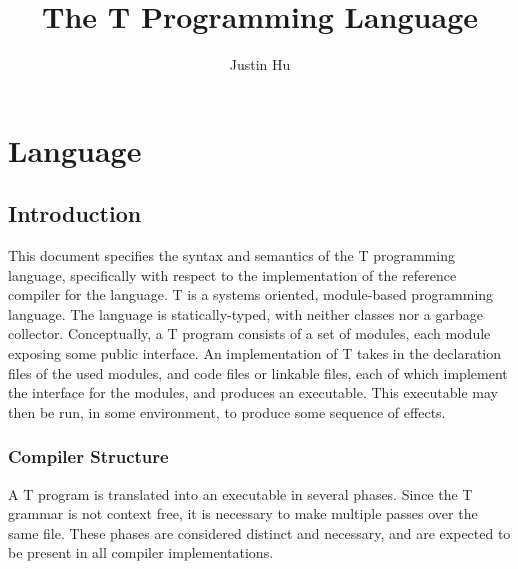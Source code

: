 \documentclass[letterpaper,12pt]{book}
\begin{document}
\title{The T Programming Language}
\author{Justin Hu}
\maketitle
\tableofcontents

\part{Language}

\chapter{Introduction}

This document specifies the syntax and semantics of the T programming language, specifically with respect to the implementation of the reference compiler for the language. T is a systems oriented, module-based programming language. The language is statically-typed, with neither classes nor a garbage collector. Conceptually, a T program consists of a set of modules, each module exposing some public interface. An implementation of T takes in the declaration files of the used modules, and code files or linkable files, each of which implement the interface for the modules, and produces an executable. This executable may then be run, in some environment, to produce some sequence of effects.

\section{Compiler Structure}

A T program is translated into an executable in several phases. Since the T grammar is not context free, it is necessary to make multiple passes over the same file. These phases are considered distinct and necessary, and are expected to be present in all compiler implementations.
\end{document}
